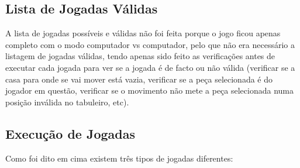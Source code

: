 \documentclass[a4paper]{article}
\begin{document}
\subsection{Lista de Jogadas Válidas} 

A lista de jogadas possíveis e válidas não foi feita porque o jogo ficou apenas completo com o modo computador vs computador, pelo que não era necessário a listagem de jogadas válidas, tendo apenas sido feito as verificações antes de executar cada jogada para ver se a jogada é de facto ou não válida (verificar se a casa para onde se vai mover está vazia, verificar se a peça selecionada é do jogador em questão, verificar se o movimento não mete a peça selecionada numa posição inválida no tabuleiro, etc).

\subsection{Execução de Jogadas} 

Como foi dito em cima existem três tipos de jogadas diferentes:
\end{document}

